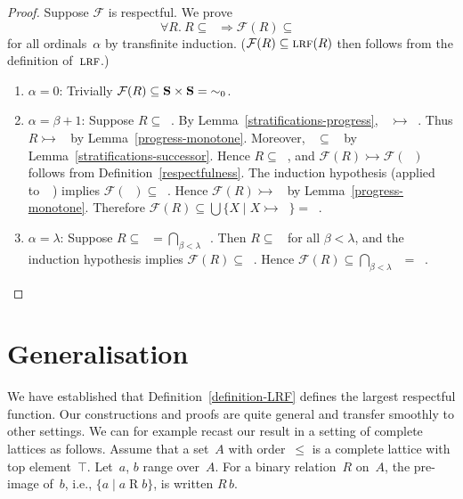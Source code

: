 \documentclass{CSML}
\theoremstyle{definition}
\newcommand{\progress}{\rightarrowtail}
\newcommand{\F}{\mathcal{F}}
\newcommand{\LRF}{\mbox{\sc{lrf}}}  \newcommand{\R}{\mathrel{R}}
\begin{document}
\begin{proof}
Suppose $\F$ is respectful.  We prove $$\forall R.\ R \subseteq
\mathop{\sim_\alpha} \Longrightarrow \F(R) \subseteq
\mathop{\sim_\alpha}$$ for all ordinals~$\alpha$ by transfinite
induction.  ($\F(R) \subseteq \LRF(R)$ then follows from the
definition of~$\LRF$.)

\begin{enumerate}
\item $\alpha = 0$: Trivially $\F(R) \subseteq {\bf S} \times {\bf S}
  = \mathop{\sim_0}$.
\item $\alpha = \beta + 1$: Suppose $R \subseteq
  \mathop{\sim_{\beta+1}}$.  By Lemma~\ref{stratifications-progress},
  $\mathop{\sim_{\beta+1}} \progress \mathop{\sim_\beta}$.  Thus $R
  \progress \mathop{\sim_\beta}$ by Lemma~\ref{progress-monotone}.
  Moreover, $\mathop{\sim_{\beta+1}} \subseteq \mathop{\sim_\beta}$ by
  Lemma~\ref{stratifications-successor}.  Hence $R \subseteq
  \mathop{\sim_\beta}$, and $\F(R) \progress \F(\mathop{\sim_\beta})$
  follows from Definition~\ref{respectfulness}.  The induction
  hypothesis (applied to~$\mathop{\sim_\beta}$) implies
  $\F(\mathop{\sim_\beta}) \subseteq \mathop{\sim_\beta}$.  Hence
  $\F(R) \progress \mathop{\sim_\beta}$ by
  Lemma~\ref{progress-monotone}.  Therefore $\F(R) \subseteq \bigcup
  \{X \mid X \progress \mathop{\sim_\beta}\} =
  \mathop{\sim_{\beta+1}}$.
\item $\alpha = \lambda$: Suppose $R \subseteq \mathop{\sim_\lambda} =
  \bigcap_{\beta < \lambda} \mathop{\sim_\beta}$.  Then $R \subseteq
  \mathop{\sim_\beta}$ for all $\beta < \lambda$, and the induction
  hypothesis implies $\F(R) \subseteq \mathop{\sim_\beta}$.  Hence
  $\F(R) \subseteq \bigcap_{\beta < \lambda} \mathop{\sim_\beta} =
  \mathop{\sim_\lambda}$.\qedhere
\end{enumerate}
\end{proof}

\section{Generalisation}

We have established that Definition~\ref{definition-LRF} defines the
largest respectful function.
Our constructions and proofs are quite general and transfer smoothly
to other settings.  We can for example recast our result in a setting
of complete lattices as follows.  Assume that a set~$A$ with
order~$\leq$ is a complete lattice with top element~$\top$.  Let~$a$,
$b$ range over~$A$.  For a binary relation~$R$ on~$A$, the pre-image
of~$b$, i.e., $\{a \mid a \R b\}$, is written $R\,b$.
\end{document}
